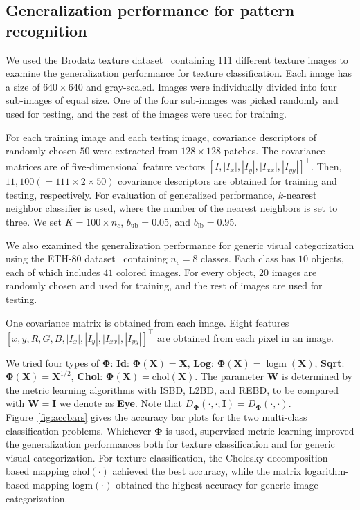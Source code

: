 \documentclass[10pt,onecolumn]{article}
\theoremstyle{definition}
\theoremstyle{definition}
\theoremstyle{definition}
\theoremstyle{definition}
\theoremstyle{definition}
\theoremstyle{theorem}
\newcommand{\0}{{\bm{0}}}
\newcommand{\1}{{\bm{1}}}
\newcommand{\vI}{{\bm{I}}}
\newcommand{\vW}{{\bm{W}}}
\newcommand{\X}{{\bm{X}}}
\newcommand{\vPhi}{{\bm{\Phi}}}
\DeclareMathOperator{\logm}{logm}
\begin{document}
\subsection{Generalization performance for pattern recognition}
%
We used the Brodatz texture dataset~\cite{randen1999filtering} containing 111
different texture images to examine the generalization
performance for texture classification. Each image has a size of
$640\times 640$ and gray-scaled. Images
were individually divided into four sub-images of equal size. One of
the four sub-images was picked randomly and used for
testing, and the rest of the images were used for training.

For each training image and each testing image, covariance
descriptors of randomly chosen $50$ were extracted from
$128\times 128$ patches. The covariance matrices are of
five-dimensional feature vectors
$\left[I,|I_{x}|,|I_{y}|,|I_{xx}|,|I_{yy}|\right]^\top$.
Then, $11,100(=111\times 2 \times 50)$ covariance
descriptors are obtained for training and testing,
respectively. For evaluation of generalized performance,
$k$-nearest neighbor classifier is used, where the number of
the nearest neighbors is set to three. We set $K=100\times
n_{c}$, $b_{\text{ub}}=0.05$, and $b_{\text{lb}}=0.95$.

We also examined the generalization performance for generic
visual categorization using the ETH-80 dataset~\cite{leibe2003analyzing} containing
$n_{c}=8$ classes. Each class has $10$ objects, each of which includes $41$
colored images. For every
object, $20$ images are randomly chosen and used for
training, and the rest of images are used for testing.

One covariance matrix is obtained from each image. Eight
features $\left[x, y, R, G, B,
|I_{x}|,|I_{y}|,|I_{xx}|,|I_{yy}|\right]^\top$ are obtained
from each pixel in an image.

We tried four types of $\vPhi$:
%
\textbf{Id}: $\vPhi(\X)=\X$,
\textbf{Log}: $\vPhi(\X)=\logm(\X)$,
\textbf{Sqrt}: $\vPhi(\X)=\X^{1/2}$,
\textbf{Chol}: $\vPhi(\X)=\text{chol}(\X)$.
The parameter $\vW$ is determined
by the metric learning algorithms with
ISBD, L2BD, and REBD, to be compared with $\vW=\vI$ we denote as \textbf{Eye}.
Note that $D_{\vPhi}(\cdot,\cdot;\vI)=D_{\vPhi}(\cdot,\cdot)$.
Figure~\ref{fig:accbars} gives the accuracy bar plots for the two
multi-class classification problems. Whichever $\vPhi$ is
used, supervised metric learning improved the generalization
performances both for texture classification and for generic
visual categorization. For texture classification, the
Cholesky decomposition-based mapping $\text{chol}(\cdot)$
achieved the best accuracy, while the matrix logarithm-based mapping
$\text{logm}(\cdot)$ obtained the highest accuracy for generic image
categorization.
\end{document}
